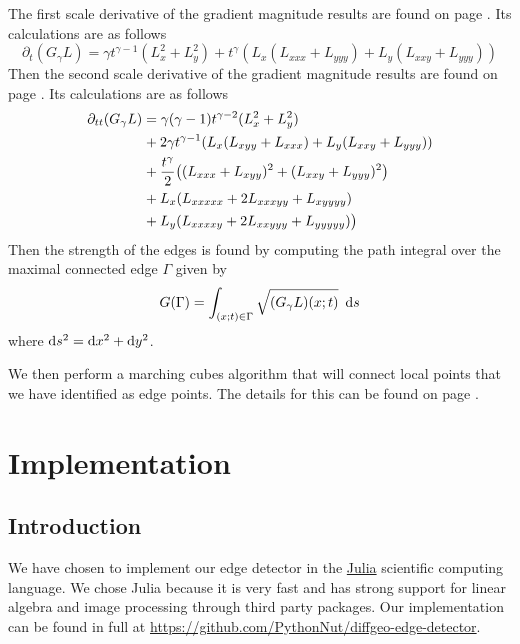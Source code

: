 \documentclass{article}
\begin{document}
The first scale derivative of the gradient magnitude results are found on page \pageref{t_tgma}. 
Its calculations are as follows \cite{Lindeberg1998}
\begin{equation} \label{dtGl}
  \partial_t (G_{\gamma}L) = \gamma t^{\gamma-1}(L_x^2+L_y^2) + t^{\gamma}(L_x(L_{xxx}+L_{yyy})+L_y(L_{xxy} + L_{yyy}))
\end{equation}
Then the second scale derivative of the gradient magnitude results are found on page \pageref{t_ttgma}.
Its calculations are as follows \cite{Lindeberg1998}
\begin{equation}
  \begin{aligned}
    \partial_{tt}(G_{\gamma}L) &= \gamma(\gamma-1)t^{\gamma-2}(L_x^2+L_y^2) \\
     & \hspace{.5pt}+ 2\gamma t^{\gamma-1}(L_x(L_{xyy}+L_{xxx})+L_y(L_{xxy}+L_{yyy})) \\
     & \hspace{.5pt}+\frac{t^{\gamma}}{2}\big((L_{xxx}+L_{xyy})^2+(L_{xxy}+L_{yyy})^2\big) \\
     & \hspace{.5pt}+ L_x(L_{xxxxx}+2L_{xxxyy}+L_{xyyyy}) \\
     & \hspace{.5pt}+ L_y(L_{xxxxy}+2L_{xxyyy}+L_{yyyyy})\big)
  \end{aligned}
\end{equation}
Then the strength of the edges is found by computing the path integral over the maximal connected edge $\Gamma$ given by \cite{Lindeberg1998}
\begin{equation} \label{estr}
  G(\Gamma) = \int_{(x;t) \in \Gamma} \sqrt{(G_{\gamma}L)(x;t)} \,\, \operatorname{d \!} s
\end{equation}
where $\operatorname{d \!} s^2=\operatorname{d \!} x^2+\operatorname{d \!} y^2$.

We then perform a marching cubes algorithm that will connect local points that we have identified as edge points. The details for this can be found on page \pageref{mcube}.

\section{Implementation}

\subsection{Introduction}

We have chosen to implement our edge detector in the \href{https://julialang.org/}{Julia} scientific computing language.
We chose Julia because it is very fast and has strong support for linear algebra and image processing through third party packages.
Our implementation can be found in full at \url{https://github.com/PythonNut/diffgeo-edge-detector}.
\end{document}
